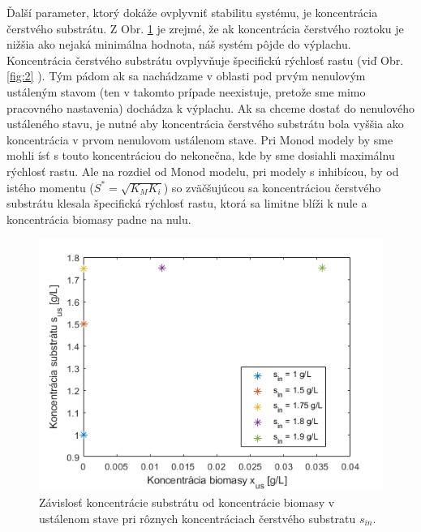 Ďalší parameter, ktorý dokáže ovplyvniť stabilitu systému, je koncentrácia čerstvého substrátu. Z Obr. \ref{fig:7} je zrejmé, že ak koncentrácia čerstvého roztoku je nižšia ako nejaká minimálna hodnota, náš systém pôjde do výplachu. Koncentrácia čerstvého substrátu ovplyvňuje špecifickú rýchlosť rastu (viď Obr. \ref{fig:2} ). Tým pádom ak sa nachádzame v oblasti pod prvým nenulovým ustáleným stavom (ten v takomto prípade neexistuje, pretože sme mimo pracovného nastavenia) dochádza k výplachu. Ak sa chceme dostať do nenulového ustáleného stavu, je nutné aby koncentrácia čerstvého substrátu bola vyššia ako koncentrácia v prvom nenulovom ustálenom stave.
Pri Monod modely by sme mohli ísť s touto koncentráciou do nekonečna, kde by sme dosiahli maximálnu rýchlosť rastu. Ale na rozdiel od Monod modelu, pri modely s inhibícou, by od istého momentu ($S^{*} = \sqrt{K_M K_i}$) so zväčšujúcou sa koncentráciou čerstvého substrátu klesala špecifická rýchlosť rastu, ktorá sa limitne blíži k nule a koncentrácia biomasy padne na nulu.

\begin{figure}
	\centering
	\includegraphics[width=.7\linewidth]{images/s_in_inhb}
	\caption[]{Závislosť koncentrácie substrátu od koncentrácie biomasy v ustálenom stave pri rôznych koncentráciach čerstvého substratu $s_{in}$.}
	\label{fig:7}
\end{figure}
